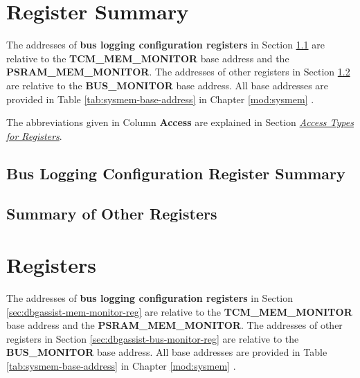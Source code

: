 \documentclass[main\_\_EN.tex]{subfiles}
\begin{document}
\newpage
\begin{landscape}
\hypertarget{dbgassist-reg-summ}{}
\section{Register Summary}
\label{sec:dbgassist-reg-summ}

The addresses of \textbf{bus logging configuration registers} in Section \ref{sec:dbgassist-mem-monitor-reg-summ} are relative to the \textbf{TCM\_MEM\_MONITOR} base address and the \textbf{PSRAM\_MEM\_MONITOR}. The addresses of other registers in Section \ref{sec:dbgassist-bus-monitor-reg-summ} are relative to the \textbf{BUS\_MONITOR} base address. All base addresses are provided in Table \ref{tab:sysmem-base-address} in Chapter \ref{mod:sysmem} \textit{}.

The abbreviations given in Column \textbf{Access} are explained in Section \hyperref[glossary-access-types]{\textit{Access Types for Registers}}.

\subsection{Bus Logging Configuration Register Summary}
\label{sec:dbgassist-mem-monitor-reg-summ}



\subsection{Summary of Other Registers}
\label{sec:dbgassist-bus-monitor-reg-summ}


\end{landscape}



\newpage
\section{Registers}

The addresses of \textbf{bus logging configuration registers} in Section \ref{sec:dbgassist-mem-monitor-reg} are relative to the \textbf{TCM\_MEM\_MONITOR} base address and the \textbf{PSRAM\_MEM\_MONITOR}. The addresses of other registers in Section \ref{sec:dbgassist-bus-monitor-reg} are relative to the \textbf{BUS\_MONITOR} base address. All base addresses are provided in Table \ref{tab:sysmem-base-address} in Chapter \ref{mod:sysmem} \textit{}.
\end{document}
